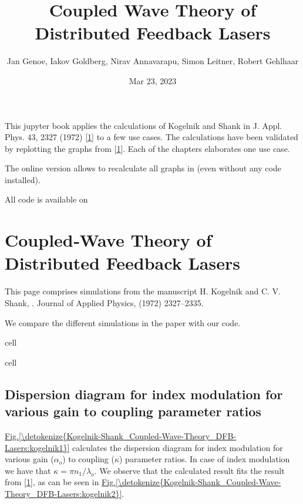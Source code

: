 \documentclass[a4paper,10pt,english,openany,oneside]{jupyterBook}
\title{Coupled Wave Theory of Distributed Feedback Lasers}
\date{Mar 23, 2023}
\author{Jan Genoe, Iakov Goldberg, Nirav Annavarapu, Simon Leitner, Robert Gehlhaar}
\begin{document}
\pagestyle{empty}
\sphinxmaketitle
\pagestyle{plain}
\sphinxtableofcontents
\pagestyle{normal}
\label{\detokenize{intro::doc}}


\sphinxAtStartPar
This jupyter book applies the calculations of Kogelnik and Shank in J. Appl. Phys. 43, 2327 (1972) {[}\hyperlink{cite.bib:id3}{1}{]} to a few use cases.
The calculations have been validated by replotting the graphs from {[}\hyperlink{cite.bib:id3}{1}{]}.
Each of the chapters elaborates one use case.

\sphinxAtStartPar
The online version allows to recalculate all graphs in  (even without any code installed).

\sphinxAtStartPar
All code is available on 

\sphinxstepscope


\chapter{Coupled‐Wave Theory of Distributed Feedback Lasers}
\label{\detokenize{Kogelnik-Shank_Coupled-Wave-Theory_DFB-Lasers:coupledwave-theory-of-distributed-feedback-lasers}}\label{\detokenize{Kogelnik-Shank_Coupled-Wave-Theory_DFB-Lasers::doc}}
\sphinxAtStartPar
This page comprises simulations from the manuscript H. Kogelnik and C. V. Shank, . Journal of Applied Physics,  (1972) 2327–2335. 

\sphinxAtStartPar
We compare the different simulations in the paper with our code.

\begin{sphinxuseclass}{cell}
\end{sphinxuseclass}
\begin{sphinxuseclass}{cell}
\end{sphinxuseclass}

\section{Dispersion diagram for index modulation for various gain to coupling parameter ratios}
\label{\detokenize{Kogelnik-Shank_Coupled-Wave-Theory_DFB-Lasers:dispersion-diagram-for-index-modulation-for-various-gain-to-coupling-parameter-ratios}}
\sphinxAtStartPar
\hyperref[\detokenize{Kogelnik-Shank_Coupled-Wave-Theory_DFB-Lasers:kogelnik1}]{Fig.\@ \ref{\detokenize{Kogelnik-Shank_Coupled-Wave-Theory_DFB-Lasers:kogelnik1}}} calculates the dispersion diagram for index modulation for various gain (\(\alpha_o\)) to coupling (\(\kappa\)) parameter ratios. In case of index modulation we have that \(\kappa= \pi n_1/\lambda_o\). We observe that the calculated result fits the result from {[}\hyperlink{cite.bib:id3}{1}{]}, as can be seen in \hyperref[\detokenize{Kogelnik-Shank_Coupled-Wave-Theory_DFB-Lasers:kogelnik2}]{Fig.\@ \ref{\detokenize{Kogelnik-Shank_Coupled-Wave-Theory_DFB-Lasers:kogelnik2}}}.
\end{document}
